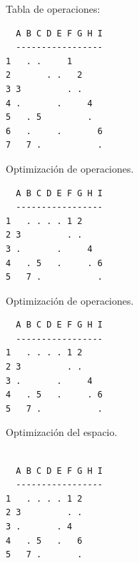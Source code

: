 \documentclass{beamer}
\begin{document}
\begin{frame}[fragile]
Tabla de operaciones:
\begin{lstlisting}
  A B C D E F G H I
  -----------------
1   . .     1      
2       . .   2        
3 3         . .        
4 .       .     4     
5   . 5         .
6   .     .       6
7   7 .           .
\end{lstlisting}
Optimización de operaciones.
\begin{lstlisting}
  A B C D E F G H I
  -----------------
1   . . . . 1 2    
2 3         . .       
3 .       .     4    
4   . 5   .     . 6
5   7 .           .
\end{lstlisting}
\end{frame}



\begin{frame}[fragile]
Optimización de operaciones.
\begin{lstlisting}
  A B C D E F G H I
  -----------------
1   . . . . 1 2    
2 3         . .       
3 .       .     4    
4   . 5   .     . 6
5   7 .           .
\end{lstlisting}
Optimización del espacio.
\begin{lstlisting}

  A B C D E F G H I
  -----------------
1   . . . . 1 2    
2 3         . .    
3 .       . 4      
4   . 5   .   6    
5   7 .       .    
\end{lstlisting}
\end{frame}
\end{document}
